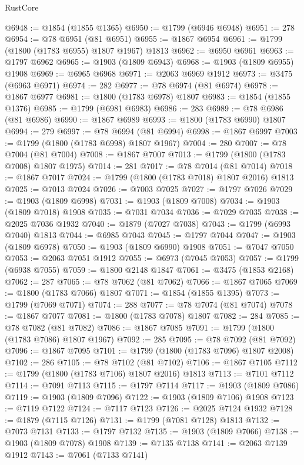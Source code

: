 \begin{lexlean}{RustCore}
\begin{coremodule}
@6948 := @1854 (@1855 @1365)
@6950 := @1799 (@6946 @6948)
@6951 := 278
@6954 := @78 @6951 (@81 @6951)
@6955 := @1867 @6954
@6961 := @1799 (@1800 (@1783 @6955) @1807 @1967) @1813
@6962 := @6950 @6961
@6963 := @1797 @6962
@6965 := @1903 (@1809 @6943)
@6968 := @1903 (@1809 @6955) @1908
@6969 := @6965 @6968
@6971 := @2063 @6969 @1912
@6973 := @3475 (@6963 @6971)
@6974 := 282
@6977 := @78 @6974 (@81 @6974)
@6978 := @1867 @6977
@6981 := @1800 (@1783 @6978) @1807
@6983 := @1854 (@1855 @1376)
@6985 := @1799 (@6981 @6983)
@6986 := 283
@6989 := @78 @6986 (@81 @6986)
@6990 := @1867 @6989
@6993 := @1800 (@1783 @6990) @1807
@6994 := 279
@6997 := @78 @6994 (@81 @6994)
@6998 := @1867 @6997
@7003 := @1799 (@1800 (@1783 @6998) @1807 @1967)
@7004 := 280
@7007 := @78 @7004 (@81 @7004)
@7008 := @1867 @7007
@7013 := @1799 (@1800 (@1783 @7008) @1807 @1975)
@7014 := 281
@7017 := @78 @7014 (@81 @7014)
@7018 := @1867 @7017
@7024 := @1799 (@1800 (@1783 @7018) @1807 @2016) @1813
@7025 := @7013 @7024
@7026 := @7003 @7025
@7027 := @1797 @7026
@7029 := @1903 (@1809 @6998)
@7031 := @1903 (@1809 @7008)
@7034 := @1903 (@1809 @7018) @1908
@7035 := @7031 @7034
@7036 := @7029 @7035
@7038 := @2025 @7036 @1932
@7040 := @1879 (@7027 @7038)
@7043 := @1799 (@6993 @7040) @1813
@7044 := @6985 @7043
@7045 := @1797 @7044
@7047 := @1903 (@1809 @6978)
@7050 := @1903 (@1809 @6990) @1908
@7051 := @7047 @7050
@7053 := @2063 @7051 @1912
@7055 := @6973 (@7045 @7053)
@7057 := @1799 (@6938 @7055)
@7059 := @1800 @2148 @1847
@7061 := @3475 (@1853 @2168)
@7062 := 287
@7065 := @78 @7062 (@81 @7062)
@7066 := @1867 @7065
@7069 := @1800 (@1783 @7066) @1807
@7071 := @1854 (@1855 @1395)
@7073 := @1799 (@7069 @7071)
@7074 := 288
@7077 := @78 @7074 (@81 @7074)
@7078 := @1867 @7077
@7081 := @1800 (@1783 @7078) @1807
@7082 := 284
@7085 := @78 @7082 (@81 @7082)
@7086 := @1867 @7085
@7091 := @1799 (@1800 (@1783 @7086) @1807 @1967)
@7092 := 285
@7095 := @78 @7092 (@81 @7092)
@7096 := @1867 @7095
@7101 := @1799 (@1800 (@1783 @7096) @1807 @2008)
@7102 := 286
@7105 := @78 @7102 (@81 @7102)
@7106 := @1867 @7105
@7112 := @1799 (@1800 (@1783 @7106) @1807 @2016) @1813
@7113 := @7101 @7112
@7114 := @7091 @7113
@7115 := @1797 @7114
@7117 := @1903 (@1809 @7086)
@7119 := @1903 (@1809 @7096)
@7122 := @1903 (@1809 @7106) @1908
@7123 := @7119 @7122
@7124 := @7117 @7123
@7126 := @2025 @7124 @1932
@7128 := @1879 (@7115 @7126)
@7131 := @1799 (@7081 @7128) @1813
@7132 := @7073 @7131
@7133 := @1797 @7132
@7135 := @1903 (@1809 @7066)
@7138 := @1903 (@1809 @7078) @1908
@7139 := @7135 @7138
@7141 := @2063 @7139 @1912
@7143 := @7061 (@7133 @7141)

\end{coremodule}
\end{lexlean}
